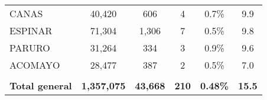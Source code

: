 \begin{tabular}{lccccc}
	\cellcolor[HTML]{FFFF99}CANAS                                   & 40,420               & 606                                  & 4                    & 0.7\%                      & 9.9                                         \\
	\cellcolor[HTML]{FFFF99}ESPINAR                                 & 71,304               & 1,306                                & 7                    & 0.5\%                      & 9.8                                         \\
	\cellcolor[HTML]{FFFF99}PARURO                                  & 31,264               & 334                                  & 3                    & 0.9\%                      & 9.6                                         \\
	\cellcolor[HTML]{FFFF99}ACOMAYO                                 & 28,477               & 387                                  & 2                    & 0.5\%                      & 7.0                                         \\
	& \multicolumn{1}{l}{} & \multicolumn{1}{l}{}                 & \multicolumn{1}{l}{} & \multicolumn{1}{l}{}       & \multicolumn{1}{l}{}                        \\
	\rowcolor[HTML]{DDEBF7} 
	\textbf{Total general}                                          & \textbf{1,357,075}   & \textbf{43,668}                      & \textbf{210}         & \textbf{0.48\%}            & \textbf{15.5}                              
\end{tabular}